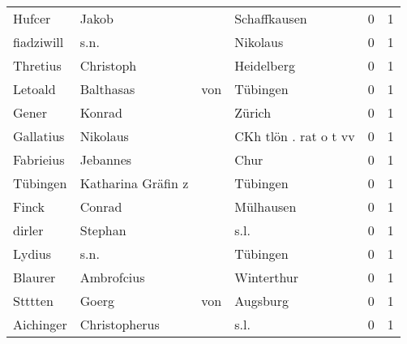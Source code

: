 \begin{center}
\begin{tiny}
\begin{longtabu}{llllrr}
                   Hufcer &                              Jakob &             &                                Schaffkausen &          0 &         1 \\
               fiadziwill &                               s.n. &             &                                    Nikolaus &          0 &         1 \\
                 Thretius &                          Christoph &             &                                  Heidelberg &          0 &         1 \\
                  Letoald &                          Balthasas &         von &                                    Tübingen &          0 &         1 \\
                    Gener &                             Konrad &             &                                      Zürich &          0 &         1 \\
                Gallatius &                           Nikolaus &             &                       CKh tlön . rat o t vv &          0 &         1 \\
                Fabrieius &                           Jebannes &             &                                        Chur &          0 &         1 \\
                 Tübingen &                 Katharina Gräfin z &             &                                    Tübingen &          0 &         1 \\
                    Finck &                             Conrad &             &                                   Mülhausen &          0 &         1 \\
                   dirler &                            Stephan &             &                                        s.l. &          0 &         1 \\
                   Lydius &                               s.n. &             &                                    Tübingen &          0 &         1 \\
                  Blaurer &                         Ambrofcius &             &                                  Winterthur &          0 &         1 \\
                  Stttten &                              Goerg &         von &                                    Augsburg &          0 &         1 \\
                Aichinger &                      Christopherus &             &                                        s.l. &          0 &         1 \\

\end{longtabu}
\end{tiny}
\end{center}

